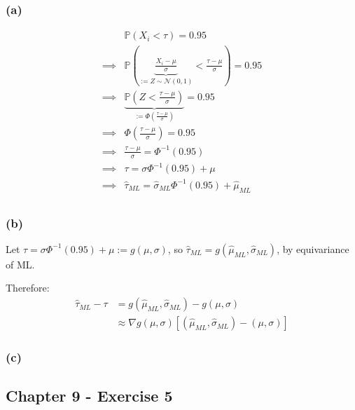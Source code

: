 \documentclass{article}
\renewcommand{\P}{\mathbb{P}}
\begin{document}
\subsubsection{(a)}
\begin{align*}
             & \P \left( X_i < \tau \right) = 0.95                                                                         \\
    \implies &
    \P \left( \underbrace{\frac{X_i - \mu}{\sigma}}_{:=Z \sim \mathcal{N}(0,1)} < \frac{\tau - \mu}{\sigma} \right) = 0.95 \\
    \implies &
    \underbrace{\P \left( Z < \frac{\tau - \mu}{\sigma} \right)}_{:= \Phi (\frac{\tau - \mu}{\sigma})} = 0.95              \\
    \implies &
    \Phi \left(\frac{\tau - \mu}{\sigma}\right) = 0.95                                                                     \\
    \implies &
    \frac{\tau - \mu}{\sigma} = \Phi^{-1}\left(0.95\right)                                                                 \\
    \implies &
    \tau = \sigma \Phi^{-1}\left(0.95\right) + \mu                                                                         \\
    \implies &
    \hat \tau_{ML} = \hat\sigma_{ML} \Phi^{-1}\left(0.95\right) + \hat\mu_{ML}                                             \\
\end{align*}

\subsubsection{(b)}
Let \(\tau = \sigma \Phi^{-1}\left(0.95\right) + \mu := g(\mu, \sigma)\), so \(\hat\tau_{ML} = g(\hat\mu_{ML}, \hat\sigma_{ML})\), by equivariance of ML.

Therefore:
\begin{align*}
    \hat\tau_{ML} - \tau
     & = g(\hat\mu_{ML}, \hat\sigma_{ML}) - g(\mu, \sigma)       \\
     & \approx \nabla g(\mu, \sigma) \left[ (\hat\mu_{ML}, \hat\sigma_{ML}) - (\mu, \sigma) \right]
\end{align*}

\subsubsection{(c)}



\subsection{Chapter 9 - Exercise 5}
\end{document}
